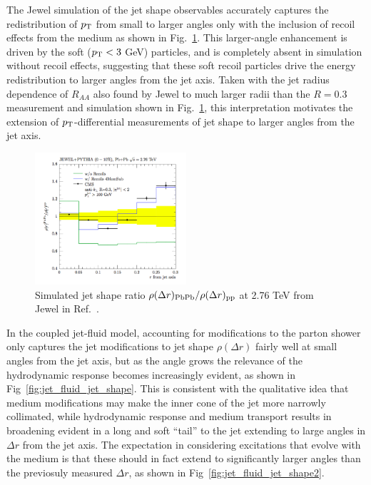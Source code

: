 The {\sc Jewel} simulation of the jet shape observables accurately captures the redistribution of $p_{\rm T}$ from small to larger angles only with the inclusion of recoil effects from the medium as shown in Fig.~\ref{fig:jewel_jet_shape}.  This larger-angle enhancement is driven by the soft ($p_{\rm T} < 3$ GeV) particles, and is completely absent in simulation without recoil effects, suggesting that these soft recoil particles drive the energy redistribution to larger angles from the jet axis.  Taken with the jet radius dependence of $R_{AA}$ also found by {\sc Jewel} to much larger radii than the $R = 0.3$ measurement and simulation shown in Fig.~\ref{fig:jewel_jet_shape}, this interpretation motivates the extension of $p_{\rm T}$-differential measurements of jet shape to larger angles from the jet axis. 


 \begin{figure}[ht!]
\begin{center}
\includegraphics[width=0.5\textwidth]{figures/Models/JEWEL_JetShape.png}
\caption[Simulated jet shape ratio $\rho(\Delta r)_{\rm PbPb}/\rho(\Delta r)_{\rm pp}$ at 2.76 TeV from {\sc Jewel}]{Simulated jet shape ratio $\rho(\Delta r)_{\rm PbPb}/\rho(\Delta r)_{\rm pp}$  at 2.76 TeV from {\sc Jewel} in Ref.~\cite{Elayavalli:2017hxo}.}
\label{fig:jewel_jet_shape}
\end{center}
\end{figure}

In the coupled jet-fluid model, accounting for modifications to the parton shower only captures the jet modifications to jet shape $\rho(\Delta r)$ fairly well at small angles from the jet axis, but as the angle grows the relevance of the hydrodynamic response becomes increasingly evident, as shown in Fig~\ref{fig:jet_fluid_jet_shape}.  This is consistent with the qualitative idea that medium modifications may make the inner cone of the jet more narrowly collimated, while hydrodynamic response and medium transport results in broadening evident in a long and soft ``tail'' to the jet extending to large angles in $\Delta r$ from the jet axis.  The expectation in considering excitations that evolve with the medium is that these should in fact extend to significantly larger angles than the previosuly measured $\Delta r$, as shown in Fig~\ref{fig:jet_fluid_jet_shape2}.


